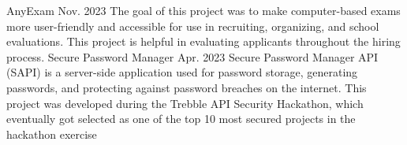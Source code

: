 

\begin{cvhonors}

  \cvhonor
    {AnyExam} %
    {Nov. 2023} %
    {The goal of this project was to make computer-based exams more user-friendly and accessible for use in recruiting, organizing, and school evaluations. This project is helpful in evaluating applicants throughout the hiring process.} %
  \cvhonor
    {Secure Password Manager} %
    {Apr. 2023} %
    {Secure Password Manager API (SAPI) is a server-side application used for password storage, generating passwords, and protecting against password breaches on the internet. This project was developed during the Trebble API Security Hackathon, which eventually got selected as one of the top 10 most secured projects in the hackathon exercise} %

\end{cvhonors}
